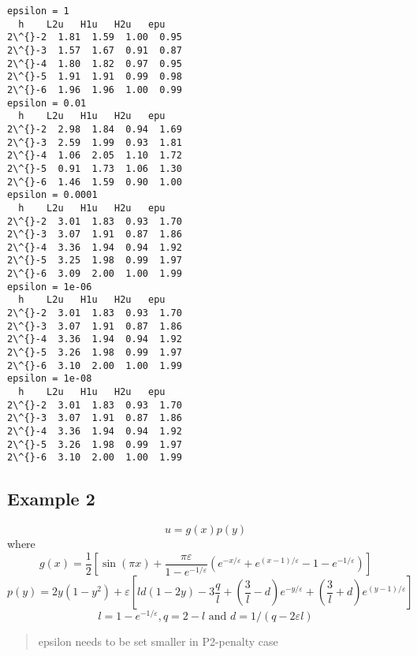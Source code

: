 \documentclass[11pt]{article}
\begin{document}
    \begin{Verbatim}[commandchars=\\\{\}]
epsilon = 1
  h    L2u   H1u   H2u   epu
2\^{}-2  1.81  1.59  1.00  0.95
2\^{}-3  1.57  1.67  0.91  0.87
2\^{}-4  1.80  1.82  0.97  0.95
2\^{}-5  1.91  1.91  0.99  0.98
2\^{}-6  1.96  1.96  1.00  0.99
epsilon = 0.01
  h    L2u   H1u   H2u   epu
2\^{}-2  2.98  1.84  0.94  1.69
2\^{}-3  2.59  1.99  0.93  1.81
2\^{}-4  1.06  2.05  1.10  1.72
2\^{}-5  0.91  1.73  1.06  1.30
2\^{}-6  1.46  1.59  0.90  1.00
epsilon = 0.0001
  h    L2u   H1u   H2u   epu
2\^{}-2  3.01  1.83  0.93  1.70
2\^{}-3  3.07  1.91  0.87  1.86
2\^{}-4  3.36  1.94  0.94  1.92
2\^{}-5  3.25  1.98  0.99  1.97
2\^{}-6  3.09  2.00  1.00  1.99
epsilon = 1e-06
  h    L2u   H1u   H2u   epu
2\^{}-2  3.01  1.83  0.93  1.70
2\^{}-3  3.07  1.91  0.87  1.86
2\^{}-4  3.36  1.94  0.94  1.92
2\^{}-5  3.26  1.98  0.99  1.97
2\^{}-6  3.10  2.00  1.00  1.99
epsilon = 1e-08
  h    L2u   H1u   H2u   epu
2\^{}-2  3.01  1.83  0.93  1.70
2\^{}-3  3.07  1.91  0.87  1.86
2\^{}-4  3.36  1.94  0.94  1.92
2\^{}-5  3.26  1.98  0.99  1.97
2\^{}-6  3.10  2.00  1.00  1.99
    \end{Verbatim}

    \subsection{Example 2}\label{example-2}

    \[
u=g(x)p(y)
\] where \[
g(x)=\frac{1}{2}\left[\sin (\pi x)+\frac{\pi \varepsilon}{1-e^{-1 / \varepsilon}}\left(e^{-x / \varepsilon}+e^{(x-1) / \varepsilon}-1-e^{-1 / \varepsilon}\right)\right]
\] \[
p(y)=2 y\left(1-y^{2}\right)+\varepsilon\left[l d(1-2 y)-3 \frac{q}{l}+\left(\frac{3}{l}-d\right) e^{-y / \varepsilon}+\left(\frac{3}{l}+d\right) e^{(y-1) / \varepsilon}\right]
\] \[
l=1-e^{-1 / \varepsilon}, q=2-l \text { and } d=1 /(q-2 \varepsilon l)
\]

    \begin{quote}
epsilon needs to be set smaller in P2-penalty case
\end{quote}
\end{document}
